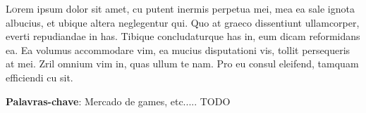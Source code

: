 

\begin{resumo}
\lettrine[lines=3]{L}orem ipsum dolor sit amet, cu putent inermis perpetua mei, mea ea sale ignota albucius, et ubique altera neglegentur qui. Quo at graeco dissentiunt ullamcorper, everti repudiandae in has. Tibique concludaturque has in, eum dicam reformidans ea. Ea volumus accommodare vim, ea mucius disputationi vis, tollit persequeris at mei. Zril omnium vim in, quas ullum te nam. Pro eu consul eleifend, tamquam efficiendi cu sit.


\vspace{.7cm}
\noindent
\textbf{Palavras-chave}: Mercado de games, etc..... TODO
\end{resumo}

